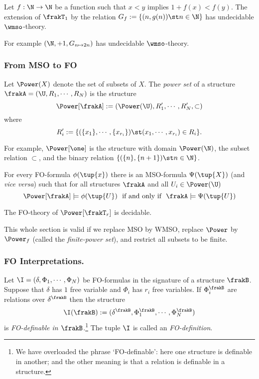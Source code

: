 \begin{theorem} \cite{ElRa66}
Let $f:\N \to \N$ be a function such that $x < y$ implies $1 + f(x) < f(y)$.
The extension of $\frakT_1$ by the relation $G_f:= \{(n,g(n)) \st n \in \N\}$ has undecidable $\wmso$-theory.
\end{theorem}

For example $(\N,+1,G_{n \mapsto 2n})$ has undecidable $\wmso$-theory.

\subsubsection{From MSO to FO}

Let $\Power(X)$ denote the set of subsets of $X$. The {\em power set} of a structure $\frakA = (\U,R_1,\cdots,R_N)$ is the structure
\[
\Power[\frakA] := (\Power(\U),{R'_1}, \cdots,{R'_N}, \subset)
\]
where 
\[
 R'_i := \{ (\{x_1\},\cdots,\{x_{r_i}\}) \st (x_1,\cdots,x_{r_i}) \in R_i\}. 
\]

For example, $\Power[\one]$ is the structure with domain $\Power(\N)$, the subset relation $\subset$, and the binary relation $\{(\{n\},\{n+1\}) \st n \in \N\}$.

\begin{proposition}[Translation]
For every FO-formula $\phi(\tup{x})$ there is an MSO-formula $\Psi(\tup{X})$ (and {\it vice versa}) such that for all structures $\frakA$ and all $U_i \in \Power(\U)$
\[
\Power[\frakA] \models \phi(\tup{U}) \ \mbox{ if and only if } \  \frakA \models \Psi(\tup{U})
\]
\end{proposition}

\begin{corollary}
The FO-theory of $\Power[\frakT_r]$ is decidable.
\end{corollary}

This whole section is valid if we replace MSO by WMSO, replace $\Power$ by $\Power_f$ (called the {\em finite-power set}), and restrict all subsets to be finite.

\subsubsection{FO Interpretations.}

Let  $\I = (\delta, \Phi_1, \cdots, \Phi_N)$ be FO-formulas in the signature of a structure $\frakB$.
Suppose that $\delta$ has $1$ free variable and $\Phi_i$ has $r_i$ free variables.
If $\Phi_i^\frakB$ are relations over $\delta^\frakB$ then the structure 
\[
\I(\frakB) := (\delta^\frakB, \Phi_1^\frakB, \cdots, \Phi_N^\frakB)
\] 
is {\em FO-definable in $\frakB$}.\footnote{We have overloaded the phrase `FO-definable': here one structure is definable in another; 
and the other meaning is that a relation is definable in a structure.} The tuple $\I$ is called an {\em FO-definition}.

